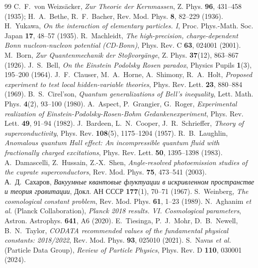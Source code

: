 \documentclass[11pt,a4paper]{article}
\theoremstyle{definition}
\theoremstyle{remark}
\begin{document}
\begin{thebibliography}{99}
C.~F.~von Weizs\"acker, \textit{Zur Theorie der Kernmassen}, Z. Phys. \textbf{96}, 431--458 (1935); H.~A.~Bethe, R.~F.~Bacher, Rev. Mod. Phys. \textbf{8}, 82--229 (1936).
H.~Yukawa, \textit{On the interaction of elementary particles. I}, Proc. Phys.-Math. Soc. Japan \textbf{17}, 48--57 (1935).
R.~Machleidt, \textit{The high-precision, charge-dependent Bonn nucleon-nucleon potential (CD-Bonn)}, Phys. Rev. C \textbf{63}, 024001 (2001).
M.~Born, \textit{Zur Quantenmechanik der Sto{\ss}vorg\"ange}, Z. Phys. \textbf{37}(12), 863--867 (1926).
J.~S.~Bell, \textit{On the Einstein Podolsky Rosen paradox}, Physics Pupils \textbf{1}(3), 195--200 (1964).
J.~F.~Clauser, M.~A.~Horne, A.~Shimony, R.~A.~Holt, \textit{Proposed experiment to test local hidden-variable theories}, Phys. Rev. Lett. \textbf{23}, 880--884 (1969).
B.~S.~Cirel'son, \textit{Quantum generalizations of Bell's inequality}, Lett. Math. Phys. \textbf{4}(2), 93--100 (1980).
A.~Aspect, P.~Grangier, G.~Roger, \textit{Experimental realization of Einstein-Podolsky-Rosen-Bohm Gedankenexperiment}, Phys. Rev. Lett. \textbf{49}, 91--94 (1982).
J.~Bardeen, L.~N.~Cooper, J.~R.~Schrieffer, \textit{Theory of superconductivity}, Phys. Rev. \textbf{108}(5), 1175--1204 (1957).
R.~B.~Laughlin, \textit{Anomalous quantum Hall effect: An incompressible quantum fluid with fractionally charged excitations}, Phys. Rev. Lett. \textbf{50}, 1395--1398 (1983).
A.~Damascelli, Z.~Hussain, Z.-X.~Shen, \textit{Angle-resolved photoemission studies of the cuprate superconductors}, Rev. Mod. Phys. \textbf{75}, 473--541 (2003).
А.~Д.~Сахаров, \textit{Вакуумные квантовые флуктуации в искривленном пространстве и теория гравитации}, Докл. АН СССР \textbf{177}(1), 70--71 (1967).
S.~Weinberg, \textit{The cosmological constant problem}, Rev. Mod. Phys. \textbf{61}, 1--23 (1989).
N.~Aghanim \textit{et al.} (Planck Collaboration), \textit{Planck 2018 results. VI. Cosmological parameters}, Astron. Astrophys. \textbf{641}, A6 (2020).
E.~Tiesinga, P.~J.~Mohr, D.~B.~Newell, B.~N.~Taylor, \textit{CODATA recommended values of the fundamental physical constants: 2018/2022}, Rev. Mod. Phys. \textbf{93}, 025010 (2021).
S.~Navas \textit{et al.} (Particle Data Group), \textit{Review of Particle Physics}, Phys. Rev. D \textbf{110}, 030001 (2024).
\end{thebibliography}
\end{document}
